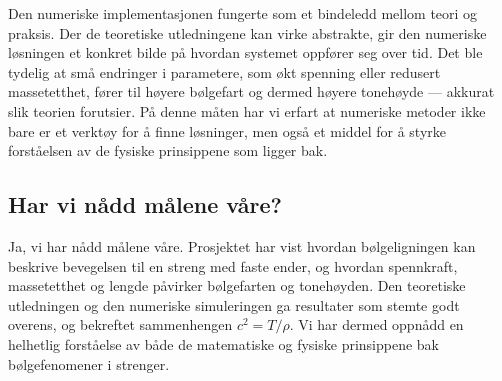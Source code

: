 Den numeriske implementasjonen fungerte som et bindeledd mellom teori og praksis. Der de teoretiske utledningene kan virke abstrakte, gir den numeriske løsningen et konkret bilde 
på hvordan systemet oppfører seg over tid. Det ble tydelig at små endringer i parametere, som økt spenning eller redusert massetetthet, fører til høyere bølgefart og dermed høyere tonehøyde — akkurat slik teorien forutsier. 
På denne måten har vi erfart at numeriske metoder ikke bare er et verktøy for å finne løsninger, men også et middel for å styrke forståelsen av de fysiske prinsippene som ligger bak.

\subsection{Har vi nådd målene våre?}

Ja, vi har nådd målene våre. Prosjektet har vist hvordan bølgeligningen kan beskrive bevegelsen til en streng med faste ender, og hvordan spennkraft, 
massetetthet og lengde påvirker bølgefarten og tonehøyden. Den teoretiske utledningen og den numeriske simuleringen ga resultater som stemte godt overens, og bekreftet 
sammenhengen $c^2 = T/\rho$. Vi har dermed oppnådd en helhetlig forståelse av både de matematiske og fysiske prinsippene bak bølgefenomener i strenger.



